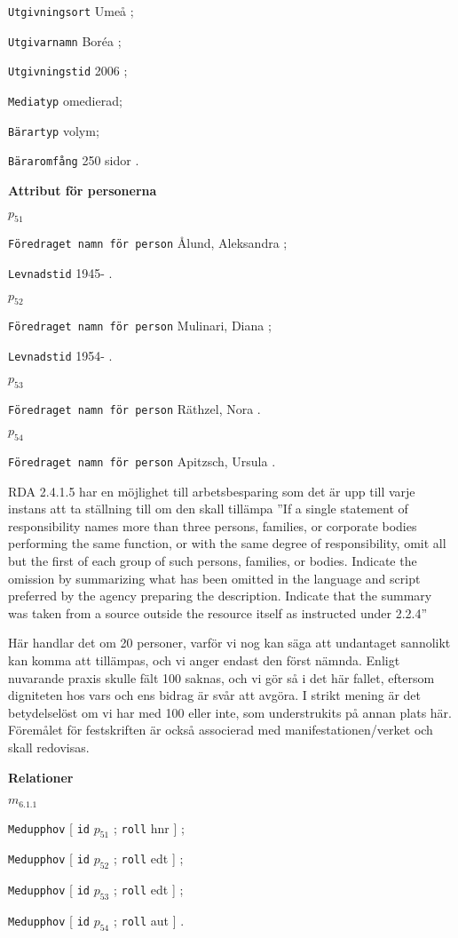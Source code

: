 \documentclass[a4,12pt]{article}
\begin{document}
 \texttt{Utgivningsort} Umeå ;

 \texttt{Utgivarnamn} Boréa ;

 \texttt{Utgivningstid} 2006 ;
 
  \texttt{Mediatyp}  omedierad;
 
 \texttt{Bärartyp}  volym;

\texttt{Bäraromfång} 250 sidor .

\vspace{3mm}


\textbf{Attribut för personerna}

\noindent $p_{51}$
 
 \texttt{Föredraget namn för person} Ålund, Aleksandra ;

  \texttt{Levnadstid} 1945- .

\noindent $p_{52}$

  \texttt{Föredraget namn för person} Mulinari, Diana ;

  \texttt{Levnadstid} 1954- .

\noindent $p_{53}$

  \texttt{Föredraget namn för person} Räthzel, Nora .

\noindent $p_{54}$

  \texttt{Föredraget namn för person} Apitzsch, Ursula .

  RDA 2.4.1.5 har en möjlighet till arbetsbesparing som det är upp
  till varje instans att ta ställning till om den skall tillämpa ''If
  a single statement of responsibility names more than three persons,
  families, or corporate bodies performing the same function, or with
  the same degree of responsibility, omit all but the first of each
  group of such persons, families, or bodies. Indicate the omission by
  summarizing what has been omitted in the language and script
  preferred by the agency preparing the description. Indicate that the
  summary was taken from a source outside the resource itself as
  instructed under 2.2.4''

  Här handlar det om 20 personer, varför vi nog kan säga att
  undantaget sannolikt kan komma att tillämpas, och vi anger endast
  den först nämnda. Enligt nuvarande praxis skulle fält 100 saknas,
  och vi gör så i det här fallet, eftersom digniteten hos vars och ens
  bidrag är svår att avgöra. I strikt mening är det betydelselöst om
  vi har med 100 eller inte, som understrukits på annan plats
  här. Föremålet för festskriften är också associerad med
  manifestationen/verket och skall redovisas.

\vspace{3mm}

\textbf{Relationer}

\noindent $m_{6.1.1}$

\texttt{Medupphov} [ \texttt{id}  $p_{51}$ ; \texttt{roll}  hnr ] ;

\texttt{Medupphov} [ \texttt{id}  $p_{52}$ ; \texttt{roll}  edt ] ;

\texttt{Medupphov} [ \texttt{id}  $p_{53}$ ; \texttt{roll}  edt ] ;

\texttt{Medupphov} [ \texttt{id}  $p_{54}$ ; \texttt{roll}  aut ] .
\end{document}
